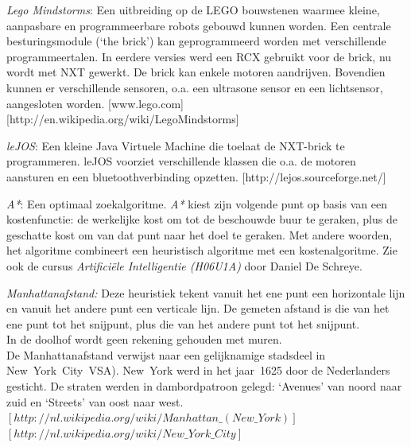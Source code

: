 \documentclass[tt3]{penoverslag}
\begin{document}




\begin{thebibliography}{9}

\textit{Lego Mindstorms}:  Een uitbreiding op de LEGO bouwstenen waarmee kleine, aanpasbare en programmeerbare robots gebouwd kunnen worden. Een centrale besturingsmodule (`the brick') kan geprogrammeerd worden met verschillende programmeertalen. In eerdere versies werd een RCX gebruikt voor de brick, nu wordt met NXT gewerkt. De brick kan enkele motoren aandrijven. Bovendien kunnen er verschillende sensoren, o.a. een ultrasone sensor en een lichtsensor, aangesloten worden.  \mbox{[www.lego.com]} \mbox{[http://en.wikipedia.org/wiki/Lego\textendash Mindstorms]}

\textit{leJOS}: Een kleine Java Virtuele Machine die toelaat de NXT-brick te programmeren. leJOS voorziet verschillende klassen die o.a. de motoren aansturen en een bluetoothverbinding opzetten.  \mbox{[http://lejos.sourceforge.net/]}

\textit{A*}: Een optimaal zoekalgoritme. \textit{A*} kiest zijn volgende punt op basis van een kostenfunctie: de werkelijke kost om tot de beschouwde buur te geraken, plus de geschatte kost om van dat punt naar het doel te geraken. Met andere woorden, het algoritme combineert een heuristisch algoritme met een kostenalgoritme. Zie ook de cursus \textit{Artifici\"ele Intelligentie (H06U1A)} door Daniel De Schreye.

\textit{Manhattanafstand:} Deze heuristiek tekent vanuit het ene punt een horizontale lijn en vanuit het andere punt een verticale lijn. De gemeten afstand is die van het ene punt tot het snijpunt, plus die van het andere punt tot het snijpunt.\\
In de doolhof wordt geen rekening gehouden met muren.\\
De Manhattanafstand verwijst naar een gelijknamige stadsdeel in New~York~City~VSA). New~York werd in het jaar~1625 door de Nederlanders gesticht. De straten werden in dambordpatroon gelegd: `Avenues' van noord naar zuid en `Streets' van oost naar west.\\
\mbox{$[http://nl.wikipedia.org/wiki/Manhattan\_(New\_York)]$}\\ \mbox{$[http://nl.wikipedia.org/wiki/New\_York\_City]$}



\end{thebibliography}
\end{document}
